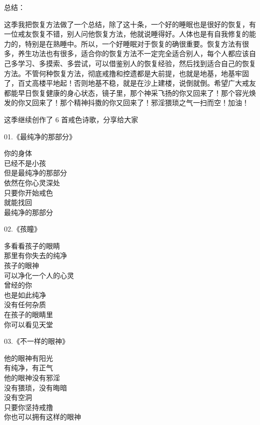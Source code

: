 总结：

这季我把恢复方法做了一个总结，除了这十条，一个好的睡眠也是很好的恢复，有一位戒友恢复不错，别人问他恢复方法，他就说睡得好。人体也是有自我修复的能力的，特别是在熟睡中。所以，一个好睡眠对于恢复的确很重要。恢复方法有很多，养生功法也有很多，适合你的恢复方法不一定完全适合别人，每个人都应该自己多学习、多摸索、多尝试，可以借鉴别人的恢复经验，然后找到适合自己的恢复方法。不管何种恢复方法，彻底戒撸和控遗都是大前提，也就是地基，地基牢固了，百丈高楼平地起！否则地基不稳，就是在沙上建楼，说倒就倒。希望广大戒友都能早日恢复健康的身心状态，镜子里，那个神采飞扬的你又回来了！那个容光焕发的你又回来了！那个精神抖擞的你又回来了！邪淫猥琐之气一扫而空！加油！

这季继续创作了 6 首戒色诗歌，分享给大家

\begin{multicols}{2}
    \begin{center}
        01.《最纯净的那部分》\it

        你的身体 \\ 已经不是小孩 \\ 但是最纯净的那部分 \\ 依然在你心灵深处 \\ 只要你开始戒色 \\ 就能找回 \\ 最纯净的那部分
    \end{center}

    \begin{center}
        02.《孩瞳》\it

        多看看孩子的眼睛 \\ 那里有你失去的纯净 \\ 孩子的眼神 \\ 可以净化一个人的心灵 \\ 曾经的你 \\ 也是如此纯净 \\ 没有任何杂质 \\ 在孩子的眼睛里 \\ 你可以看见天堂
    \end{center}

    \begin{center}
        03.《不一样的眼神》\it

        他的眼神有阳光 \\ 有纯净，有正气 \\ 他的眼神没有邪淫 \\ 没有猥琐，没有晦暗 \\ 没有空洞 \\ 只要你坚持戒撸 \\ 你也可以拥有这样的眼神
    \end{center}


\end{multicols}
